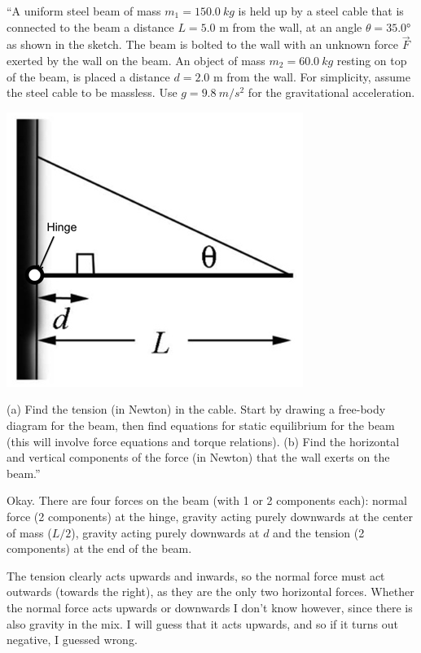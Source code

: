 \documentclass[8.01x]{subfiles}
\begin{document}
``A uniform steel beam of mass $m_1 = \SI{150.0}{kg}$ is held up by a steel cable that is connected to the beam a distance $L = 5.0$ m from the wall, at an angle $\theta = \ang{35.0}$ as shown in the sketch. The beam is bolted to the wall with an unknown force $\vec{F}$ exerted by the wall on the beam. An object of mass $m_2 =  \SI{60.0}{kg}$ resting on top of the beam, is placed a distance $d = 2.0$ m from the wall. For simplicity, assume the steel cable to be massless. Use $g = \SI{9.8}{m/s^2}$ for the gravitational acceleration.

\begin{center}
\includegraphics[scale=1.15]{Graphics/h9p2}
\end{center}

(a) Find the tension (in Newton) in the cable. Start by drawing a free-body diagram for the beam, then find equations for static equilibrium for the beam (this will involve force equations and torque relations).
(b) Find the horizontal and vertical components of the force (in Newton) that the wall exerts on the beam.''

Okay. There are four forces on the beam (with 1 or 2 components each): normal force (2 components) at the hinge, gravity acting purely downwards at the center of mass ($L/2$), gravity acting purely downwards at $d$ and the tension (2 components) at the end of the beam.

The tension clearly acts upwards and inwards, so the normal force must act outwards (towards the right), as they are the only two horizontal forces. Whether the normal force acts upwards or downwards I don't know however, since there is also gravity in the mix. I will guess that it acts upwards, and so if it turns out negative, I guessed wrong.
\end{document}
